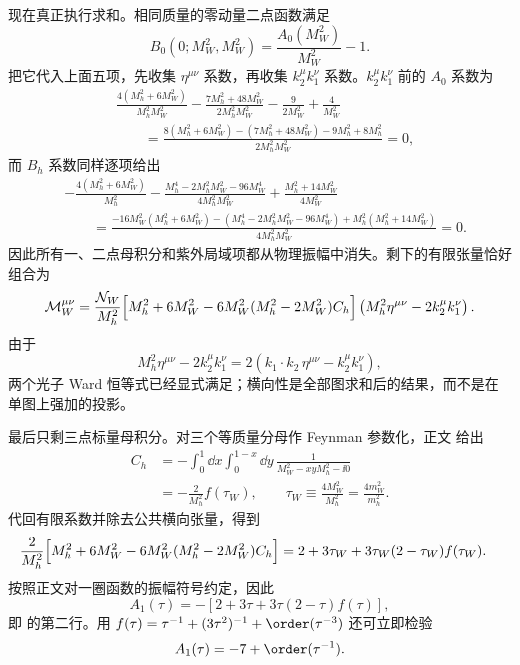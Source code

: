 \begin{derivation}
现在真正执行求和。相同质量的零动量二点函数满足
\begin{equation*}
 B_0(0;M_W^2,M_W^2)=\frac{A_0(M_W^2)}{M_W^2}-1.
\end{equation*}
把它代入上面五项，先收集 $\eta^{\mu\nu}$ 系数，再收集 $k_2^\mu k_1^\nu$ 系数。$k_2^\mu k_1^\nu$ 前的 $A_0$ 系数为
\begin{align*}
&\frac{4(M_h^2+6M_W^2)}{M_h^2M_W^2}
-\frac{7M_h^2+48M_W^2}{2M_h^2M_W^2}
-\frac{9}{2M_W^2}+\frac{4}{M_W^2}\\
&\qquad
=\frac{8(M_h^2+6M_W^2)-(7M_h^2+48M_W^2)-9M_h^2+8M_h^2}
{2M_h^2M_W^2}=0,
\end{align*}
而 $B_h$ 系数同样逐项给出
\begin{align*}
&-\frac{4(M_h^2+6M_W^2)}{M_h^2}
-\frac{M_h^4-2M_h^2M_W^2-96M_W^4}{4M_h^2M_W^2}
+\frac{M_h^2+14M_W^2}{4M_W^2}\\
&\qquad
=\frac{-16M_W^2(M_h^2+6M_W^2)
-(M_h^4-2M_h^2M_W^2-96M_W^4)
+M_h^2(M_h^2+14M_W^2)}{4M_h^2M_W^2}=0.
\end{align*}
因此所有一、二点母积分和紫外局域项都从物理振幅中消失。剩下的有限张量恰好组合为
\begin{equation*}
\mathcal M_W^{\mu\nu}
=\frac{\mathcal N_W}{M_h^2}
\Bigl[M_h^2+6M_W^2-6M_W^2(M_h^2-2M_W^2)C_h\Bigr]
\left(M_h^2\eta^{\mu\nu}-2k_2^\mu k_1^\nu\right).
\end{equation*}
由于
\begin{equation*}
M_h^2\eta^{\mu\nu}-2k_2^\mu k_1^\nu
=2\left(k_1\!\cdot k_2\,\eta^{\mu\nu}-k_2^\mu k_1^\nu\right),
\end{equation*}
两个光子 Ward 恒等式已经显式满足；横向性是全部图求和后的结果，而不是在单图上强加的投影。

最后只剩三点标量母积分。对三个等质量分母作 Feynman 参数化，正文 给出
\begin{align*}
 C_h
&=-\int_0^1\dd x\int_0^{1-x}\dd y\,
\frac{1}{M_W^2-xyM_h^2-\ii0}\\
&=-\frac{2}{M_h^2}f(\tau_W),
\qquad
\tau_W\equiv\frac{4M_W^2}{M_h^2}=\frac{4m_W^2}{m_h^2}.
\end{align*}
代回有限系数并除去公共横向张量，得到
\begin{align*}
\frac{2}{M_h^2}
\Bigl[M_h^2+6M_W^2-6M_W^2(M_h^2-2M_W^2)C_h\Bigr]
&=2+3\tau_W+3\tau_W(2-\tau_W)f(\tau_W).
\end{align*}
按照正文对一圈函数的振幅符号约定，因此
\begin{equation*}
{
A_1(\tau)
=-\left[2+3\tau+3\tau(2-\tau)f(\tau)\right],}
\end{equation*}
即 的第二行。用
$f(\tau)=\tau^{-1}+(3\tau^2)^{-1}+\order(\tau^{-3})$
还可立即检验
\begin{equation*}
A_1(\tau)=-7+\order(\tau^{-1}).
\end{equation*}
\end{derivation}

